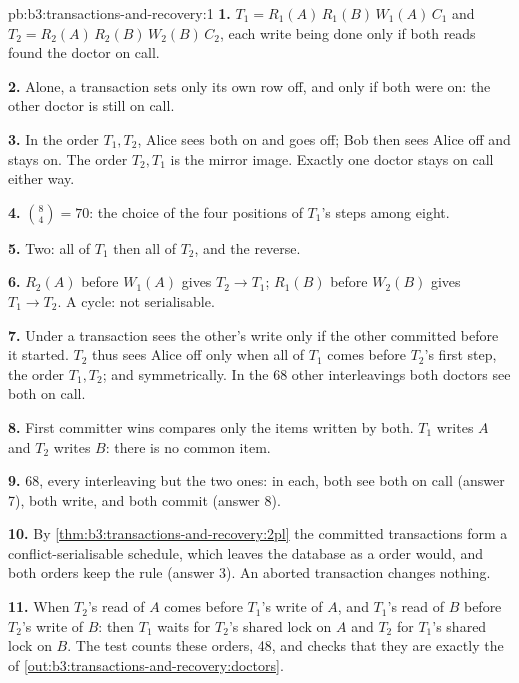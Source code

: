 \begin{solution}{pb:b3:transactions-and-recovery:1}
\textbf{1.} $T_1 = R_1(A)\,R_1(B)\,W_1(A)\,C_1$ and $T_2 = R_2(A)\,R_2(B)\,W_2(B)\,C_2$, each write being done only if both reads found the doctor on call.

\textbf{2.} Alone, a transaction sets only its own row off, and only if both were on: the other doctor is still on call.

\textbf{3.} In the order $T_1, T_2$, Alice sees both on and goes off; Bob then sees Alice off and stays on. The order $T_2, T_1$ is the mirror image. Exactly one doctor stays on call either way.

\textbf{4.} $\binom{8}{4} = 70$: the choice of the four positions of $T_1$'s steps among eight.

\textbf{5.} Two: all of $T_1$ then all of $T_2$, and the reverse.

\textbf{6.} $R_2(A)$ before $W_1(A)$ gives $T_2 \to T_1$; $R_1(B)$ before $W_2(B)$ gives $T_1 \to T_2$. A cycle: not serialisable.

\textbf{7.} Under  a transaction sees the other's write only if the other committed before it started. $T_2$ thus sees Alice off only when all of $T_1$ comes before $T_2$'s first step, the  order $T_1, T_2$; and symmetrically. In the 68 other interleavings both doctors see both on call.

\textbf{8.} First committer wins compares only the items written by both. $T_1$ writes $A$ and $T_2$ writes $B$: there is no common item.

\textbf{9.} 68, every interleaving but the two  ones: in each, both see both on call (answer 7), both write, and both commit (answer 8).

\textbf{10.} By \cref{thm:b3:transactions-and-recovery:2pl} the committed transactions form a conflict-serialisable schedule, which leaves the database as a  order would, and both  orders keep the rule (answer 3). An aborted transaction changes nothing.

\textbf{11.} When $T_2$'s read of $A$ comes before $T_1$'s write of $A$, and $T_1$'s read of $B$ before $T_2$'s write of $B$: then $T_1$ waits for $T_2$'s shared lock on $A$ and $T_2$ for $T_1$'s shared lock on $B$. The test counts these orders, 48, and checks that they are exactly the  of \cref{out:b3:transactions-and-recovery:doctors}.


\end{solution}
